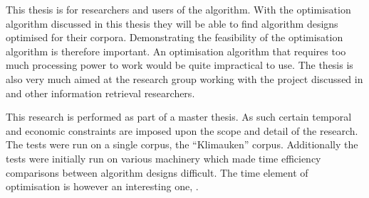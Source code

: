 This thesis is for researchers and users of the \STC algorithm. With the optimisation algorithm discussed in this thesis they will be able to find algorithm designs optimised for their corpora. Demonstrating the feasibility of the optimisation algorithm is therefore important. An optimisation algorithm that requires too much processing power to work would be quite impractical to use. The thesis is also very much aimed at the research group working with the project discussed in  and other information retrieval researchers.

This research is performed as part of a master thesis. As such certain temporal and economic constraints are imposed upon the scope and detail of the research. The tests were run on a single corpus, the ``Klimauken'' corpus. Additionally the tests were initially run on various machinery which made time efficiency comparisons between algorithm designs difficult. The time element of optimisation is however an interesting one, \parencite{Moe2013compact}.